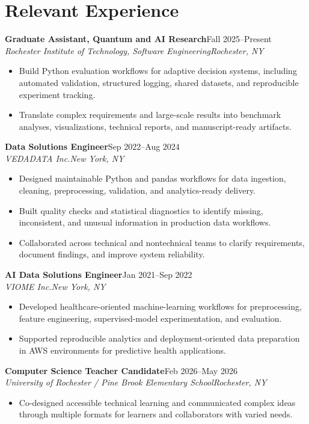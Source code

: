 \documentclass[10pt,letterpaper]{article}
\newcommand{\role}[4]{%
  \textbf{#1}\hfill #2\\
  \textit{#3}\hfill \textit{#4}\vspace{-3pt}
}
\begin{document}
\section*{Relevant Experience}
\role{Graduate Assistant, Quantum and AI Research}{Fall 2025--Present}
{Rochester Institute of Technology, Software Engineering}{Rochester, NY}
\begin{itemize}
  \item Build Python evaluation workflows for adaptive decision systems,
    including automated validation, structured logging, shared datasets, and
    reproducible experiment tracking.
  \item Translate complex requirements and large-scale results into benchmark
    analyses, visualizations, technical reports, and manuscript-ready artifacts.
\end{itemize}

\role{Data Solutions Engineer}{Sep 2022--Aug 2024}
{VEDADATA Inc.}{New York, NY}
\begin{itemize}
  \item Designed maintainable Python and pandas workflows for data ingestion,
    cleaning, preprocessing, validation, and analytics-ready delivery.
  \item Built quality checks and statistical diagnostics to identify missing,
    inconsistent, and unusual information in production data workflows.
  \item Collaborated across technical and nontechnical teams to clarify
    requirements, document findings, and improve system reliability.
\end{itemize}

\role{AI Data Solutions Engineer}{Jan 2021--Sep 2022}
{VIOME Inc.}{New York, NY}
\begin{itemize}
  \item Developed healthcare-oriented machine-learning workflows for
    preprocessing, feature engineering, supervised-model experimentation, and
    evaluation.
  \item Supported reproducible analytics and deployment-oriented data
    preparation in AWS environments for predictive health applications.
\end{itemize}

\role{Computer Science Teacher Candidate}{Feb 2026--May 2026}
{University of Rochester / Pine Brook Elementary School}{Rochester, NY}
\begin{itemize}
  \item Co-designed accessible technical learning and communicated complex
    ideas through multiple formats for learners and collaborators with varied needs.
\end{itemize}
\end{document}
